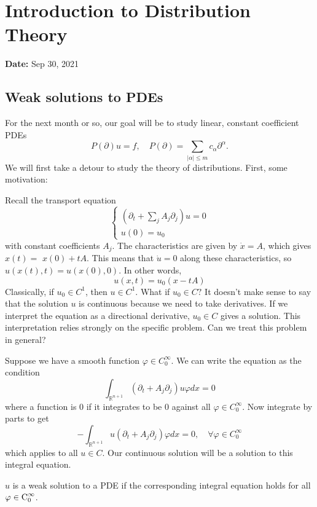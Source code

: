 \newpage
\section{Introduction to Distribution Theory}
\textbf{Date:} Sep 30, 2021
\subsection{Weak solutions to PDEs}
For the next month or so, our goal will be to study linear, constant coefficient PDEs 
\[
    P(\partial) u=f, \quad P(\partial)=\sum_{|\alpha| \leq m} c_{\alpha} \partial^{\alpha}.
\]
We will first take a detour to study the theory of distributions. First, some motivation: 
\begin{example}
Recall the transport equation 
\[
    \left\{\begin{array}{l}
        \left(\partial_{t}+ \sum_j A_{j} \partial_{j}\right) u=0 \\
        u(0)=u_{0}
        \end{array}\right.
\]
with constant coefficients $A_{j} .$ The characteristics are given by $\dot{x}=A$, which gives $x(t)=$ $x(0)+t A$. This means that $\dot{u}=0$ along these characteristics, so $u(x(t), t)=u(x(0), 0)$. In other words,
$$
u(x, t)=u_{0}(x-t A)
$$
Classically, if $u_{0} \in C^{1}$, then $u \in C^{1} .$ What if $u_{0} \in C ?$ It doesn't make sense to say that the solution $u$ is continuous because we need to take derivatives. If we interpret the equation as a directional derivative, $u_{0} \in C$ gives a solution. This interpretation relies strongly on the specific problem. Can we treat this problem in general?

Suppose we have a smooth function $\varphi \in C_{0}^{\infty}$. We can write the equation as the condition
$$
\int_{\mathbb{R}^{n+1}}\left(\partial_{t}+A_{j} \partial_{j}\right) u \varphi d x=0
$$
where a function is 0 if it integrates to be 0 against all $\varphi \in C_{0}^{\infty}$. Now integrate by parts to get
$$
-\int_{\mathbb{R}^{n+1}} u\left(\partial_{t}+A_{j} \partial_{j}\right) \varphi d x=0, \quad \forall \varphi \in C_{0}^{\infty}
$$
which applies to all $u \in C .$ Our continuous solution will be a solution to this integral equation.
\end{example}

\begin{definition}
    $u$ is a weak solution to a PDE if the corresponding integral equation holds for all $\varphi\in \operatorname{C}_0^\infty$.
\end{definition}


